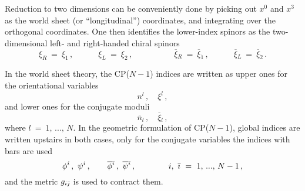 \documentclass[12pt]{article}
\newcommand{\ov}{\overline}
\begin{document}
Reduction to two dimensions can be conveniently done by picking out $ x^0 $ and $ x^3 $ 
as the world sheet (or ``longitudinal'') coordinates, and integrating over the orthogonal coordinates. 
One then identifies the lower-index spinors as the two-dimensional left- and right-handed chiral spinors
\[
	\xi_{R} ~=~ \xi_{1}\,, \quad\qquad
	\xi_{L} ~=~ \xi_{2}\,, \quad\qquad\qquad
	\ov{\xi}{}_{R} ~=~ \ov{\xi}{}_{\dot{1}}\,, \quad\qquad
	\ov{\xi}{}_{L} ~=~ \ov{\xi}{}_{\dot{2}}\,.
\]

In the world sheet theory, the CP($N-1$) indices are written as upper ones for the orientational variables
\[
	n^l\,, \quad \xi^l\,,
\]
and lower ones for the conjugate moduli
\[
	\ov{n}{}_l\,, \quad \ov{\xi}{}_l\,, 
\]
where $ l~=~1,\, ...,\, N $.
In the geometric formulation of CP($N-1$), global indices are written upstairs in both cases, only
for the conjugate variables the indices with bars are used 
\[
	\phi^i\,,\ \psi^i\,, \qquad \ov{\phi}{}^\bi\,,\ \ov{\psi}{}^\bi\,, 
	\qquad\qquad i,\ \bi ~=~ 1,\,...,\,N-1\,,
\]
and the metric $ g_{i{\bar \jmath}} $ is used to contract them.

\vspace{1cm}
\end{document}
